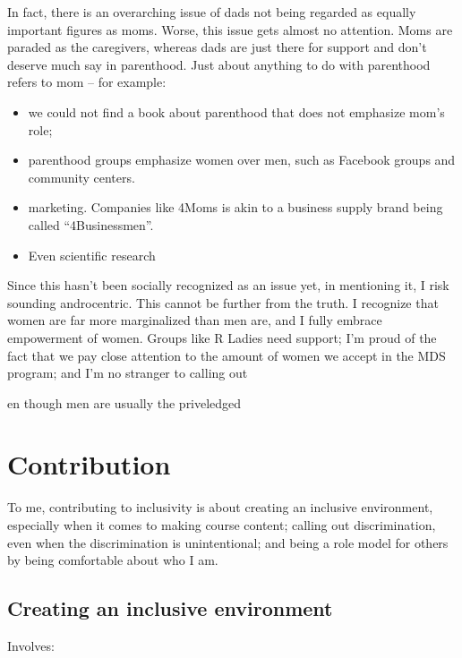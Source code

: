 \documentclass[]{book}
\providecommand{\tightlist}{%
  \setlength{\itemsep}{0pt}\setlength{\parskip}{0pt}}
\begin{document}
In fact, there is an overarching issue of dads not being regarded as equally important figures as moms. Worse, this issue gets almost no attention. Moms are paraded as the caregivers, whereas dads are just there for support and don't deserve much say in parenthood. Just about anything to do with parenthood refers to mom -- for example:

\begin{itemize}
\tightlist
\item
  we could not find a book about parenthood that does not emphasize mom's role;
\item
  parenthood groups emphasize women over men, such as Facebook groups and community centers.
\item
  marketing. Companies like 4Moms is akin to a business supply brand being called ``4Businessmen''.
\item
  Even scientific research
\end{itemize}

Since this hasn't been socially recognized as an issue yet, in mentioning it, I risk sounding androcentric. This cannot be further from the truth. I recognize that women are far more marginalized than men are, and I fully embrace empowerment of women. Groups like R Ladies need support; I'm proud of the fact that we pay close attention to the amount of women we accept in the MDS program; and I'm no stranger to calling out

en though men are usually the priveledged

\hypertarget{contribution}{%
\section{Contribution}\label{contribution}}

To me, contributing to inclusivity is about creating an inclusive environment, especially when it comes to making course content; calling out discrimination, even when the discrimination is unintentional; and being a role model for others by being comfortable about who I am.

\hypertarget{creating-an-inclusive-environment}{%
\subsection{Creating an inclusive environment}\label{creating-an-inclusive-environment}}

Involves:
\end{document}
